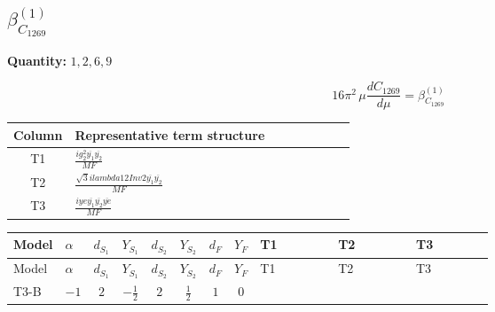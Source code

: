 \documentclass[8pt]{article}
\begin{document}
\begin{landscape}
\section*{$\beta_{C_{1269}}^{(1)}$}
\noindent\textbf{Quantity: }$\mathrm{1,2,6,9}$\par\smallskip
\[16\pi^2\,\mu\frac{d C_{1269}}{d\mu}=\beta_{C_{1269}}^{(1)}\]
\begin{center}
\begin{tabular}{@{}c >{\raggedright\arraybackslash}p{0.82\linewidth}@{}}
\toprule
Column & Representative term structure \\
\midrule
T1 & \(\displaystyle \frac{i g_{2}^{2} \overline{y_{1}} \overline{y_{2}}}{MF}\) \\
\midrule
T2 & \(\displaystyle \frac{\sqrt{3} i lambda12Inv2 \overline{y_{1}} \overline{y_{2}}}{MF}\) \\
\midrule
T3 & \(\displaystyle \frac{i ye \overline{y_{1}} \overline{y_{2}} \overline{ye}}{MF}\) \\
\midrule
\bottomrule
\end{tabular}
\end{center}
\smallskip
\tiny
\begin{longtable}{@{}llcccccc >{\raggedright\arraybackslash}p{0.21\linewidth} >{\raggedright\arraybackslash}p{0.21\linewidth} >{\raggedright\arraybackslash}p{0.21\linewidth}@{}}
\toprule
Model & $\alpha$ & $d_{S_1}$ & $Y_{S_1}$ & $d_{S_2}$ & $Y_{S_2}$ & $d_F$ & $Y_F$ & T1 & T2 & T3 \\
\midrule
\endfirsthead
\toprule
Model & $\alpha$ & $d_{S_1}$ & $Y_{S_1}$ & $d_{S_2}$ & $Y_{S_2}$ & $d_F$ & $Y_F$ & T1 & T2 & T3 \\
\midrule
\endhead
T3-B & $-1$ & $2$ & $-\frac{1}{2}$ & $2$ & $\frac{1}{2}$ & $1$ & $0$ & \scriptsize\adjustbox{max width=\linewidth}{$\begin{gathered} - \frac{3 i g_{2}^{2} \overline{y_{1}} \overline{y_{2}}}{8 MF}\end{gathered}$} & \scriptsize\adjustbox{max width=\linewidth}{$\begin{gathered} - \frac{\sqrt{3} i lambda12Inv2 \overline{y_{1}} \overline{y_{2}}}{6 MF}\end{gathered}$} & \scriptsize\adjustbox{max width=\linewidth}{$\begin{gathered} \frac{i ye \overline{y_{1}} \overline{y_{2}} \overline{ye}}{8 MF}\end{gathered}$} \\
\midrule
\bottomrule
\end{longtable}
\clearpage

\end{landscape}
\end{document}
